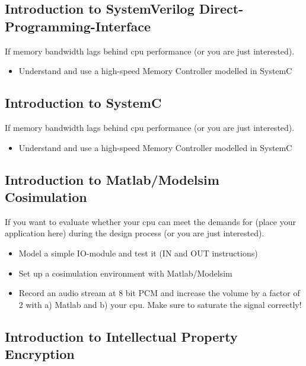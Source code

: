 \subsection{Introduction to SystemVerilog Direct-Programming-Interface}
If memory bandwidth lags behind cpu performance (or you are just interested).
\begin{itemize}
\item Understand and use a high-speed Memory Controller modelled in SystemC
\end{itemize}

\subsection{Introduction to SystemC}
If memory bandwidth lags behind cpu performance (or you are just interested).
\begin{itemize}
\item Understand and use a high-speed Memory Controller modelled in SystemC
\end{itemize}

\subsection{Introduction to Matlab/Modelsim Cosimulation}
If you want to evaluate whether your cpu can meet the demands for (place your application here) during the design process (or you are just interested).
\begin{itemize}
\item Model a simple IO-module and test it (IN and OUT instructions)
\item Set up a cosimulation environment with Matlab/Modelsim
\item Record an audio stream at 8 bit PCM and increase the volume by a factor of 2 with a) Matlab and b) your cpu. Make sure to saturate the signal correctly!
\end{itemize}

\subsection{Introduction to Intellectual Property Encryption}
